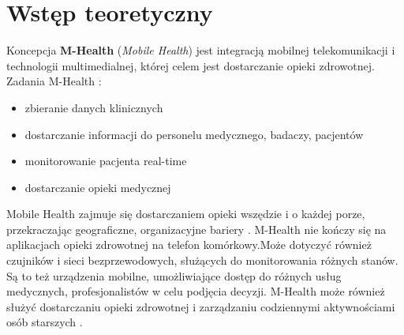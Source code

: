 \chapter{Wstęp teoretyczny}
\label{cha:wstep_teoretyczny}

Koncepcja \textbf{M-Health} (\emph{Mobile Health}) jest integracją mobilnej telekomunikacji i technologii multimedialnej, której celem jest dostarczanie opieki zdrowotnej.\\
Zadania M-Health \cite{5969916} :
\begin{itemize}
\item zbieranie danych klinicznych
\item dostarczanie informacji do personelu medycznego, badaczy, pacjentów
\item monitorowanie pacjenta real-time
\item dostarczanie opieki medycznej
\end{itemize}
Mobile Health zajmuje się dostarczaniem opieki wszędzie i o każdej porze, przekraczając geograficzne, organizacyjne bariery \cite{6655256}. M-Health nie kończy się na aplikacjach opieki zdrowotnej na telefon komórkowy.Może dotyczyć również czujników i sieci bezprzewodowych, służących do monitorowania różnych stanów. Są to też urządzenia mobilne, umożliwiające dostęp do różnych usług medycznych, profesjonalistów w celu podjęcia decyzji. M-Health może również służyć dostarczaniu opieki zdrowotnej i zarządzaniu codziennymi aktywnościami osób starszych \cite{Varshney2014}.


